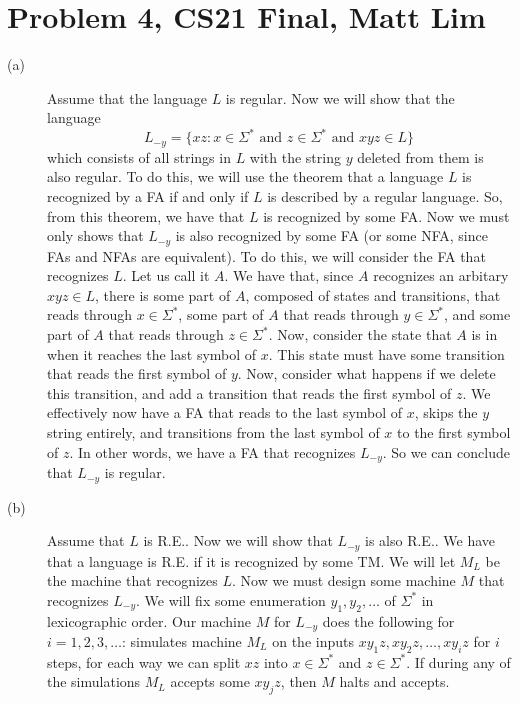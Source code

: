 \documentclass{article}
\begin{document}
\section*{Problem 4, CS21 Final, Matt Lim}
\begin{description}
    \item[(a)]
        Assume that the language $L$ is regular. Now we will show that
        the language
        \[ L_{-y} = \{xz : x \in \Sigma^* \text{ and } z \in \Sigma^* \text{ and
        } xyz \in L\} \]
        which consists of all strings in $L$ with the string $y$ deleted from
        them is also regular. To do this, we will use the theorem that a
        language $L$ is recognized by a FA if and only if $L$ is described by
        a regular language. So, from this theorem, we have that $L$ is
        recognized by some FA. Now we must only shows that $L_{-y}$ is also
        recognized by some FA (or some NFA, since FAs and NFAs are equivalent).
        To do this, we will consider the FA that recognizes $L$. Let us call
        it $A$. We have that, since $A$ recognizes an arbitary $xyz \in L$, there
        is some part of $A$, composed of states and transitions, that reads through
        $x \in \Sigma^*$, some part of $A$ that reads through $y \in \Sigma^*$,
        and some part of $A$ that reads through $z \in \Sigma^*$. Now, consider
        the state that $A$ is in when it reaches the last symbol of $x$. This
        state must have some transition that reads the first symbol of $y$. Now,
        consider what happens if we delete this transition, and add a transition that reads
        the first symbol of $z$. We effectively now have a FA that reads to the
        last symbol of $x$, skips the $y$ string entirely, and transitions from
        the last symbol of $x$ to the first symbol of $z$. In other words, we
        have a FA that recognizes $L_{-y}$. So we can conclude that $L_{-y}$ is
        regular.
    \item[(b)]
        Assume that $L$ is R.E.. Now we will show that $L_{-y}$ is also R.E..
        We have that a language is R.E. if it is recognized by some TM. We will
        let $M_L$ be the machine that recognizes $L$. Now we must design some
        machine $M$ that recognizes $L_{-y}$. We will fix some enumeration
        $y_1, y_2, \dots$
        of $\Sigma^*$ in lexicographic order. Our machine $M$ for $L_{-y}$ does
        the following for $i = 1, 2, 3, \dots$: simulates machine
        $M_L$ on the inputs $xy_1z, xy_2z, \dots, xy_iz$ for $i$ steps, for
        each way we can split $xz$ into $x \in \Sigma^*$ and $z \in \Sigma^*$. If
        during any of the simulations $M_L$ accepts some $xy_jz$, then $M$
        halts and accepts.


\end{description}
\end{document}

